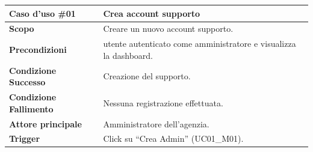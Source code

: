 \documentclass[a4paper,11pt]{article}
\renewcommand{\arraystretch}{1.18}
\begin{document}
\newpage
\begin{table}[htbp]
\centering
\renewcommand{\arraystretch}{1.5}
\begin{tabular}{|p{3cm}|l|p{4.5cm}|p{4.5cm}|}
\hline
\rowcolor[HTML]{010066} 
{\color[HTML]{EFEFEF} \textbf{Caso d'uso \#01}} & \multicolumn{3}{l|}{\color[HTML]{FFFFFF} \textbf{Crea account supporto}} \\ \hline

\textbf{Scopo} & \multicolumn{3}{l|}{Creare un nuovo account supporto.} \\ \hline

\textbf{Precondizioni} & \multicolumn{3}{l|}{utente autenticato come amministratore e visualizza la dashboard.} \\ \hline

\textbf{Condizione Successo} & \multicolumn{3}{l|}{Creazione del supporto.} \\ \hline

\textbf{Condizione Fallimento} & \multicolumn{3}{l|}{Nessuna registrazione effettuata.} \\ \hline

\textbf{Attore principale} & \multicolumn{3}{l|}{Amministratore dell'agenzia.} \\ \hline

\textbf{Trigger} & \multicolumn{3}{l|}{Click su ``Crea Admin'' (UC01\_M01).} \\ \hline


\end{tabular}
\end{table}
\end{document}
